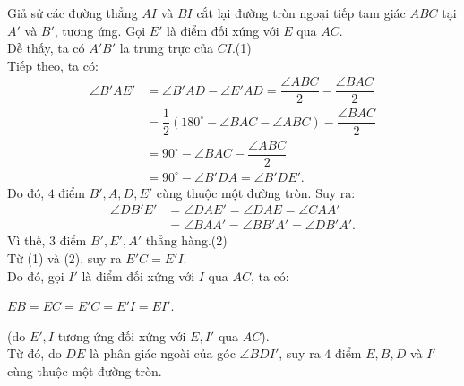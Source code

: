 \begin{bt}
{\begin{nx}
\begin{enumerate}
\begin{enumerate}
\begin{center}
					\end{center}
					Giả sử các đường thẳng $AI$ và $BI$ cắt lại đường tròn ngoại tiếp tam giác $ABC$ tại $A'$ và $B'$, tương ứng. Gọi $E'$ là điểm đối xứng với $E$ qua $AC$.\\
					Dễ thấy, ta có $A'B'$ la trung trực của $CI$.\hfill(1)\\
					Tiếp theo, ta có:
					\begin{align*}
					\angle B'AE'&=\angle B'AD-\angle E'AD=\dfrac{\angle ABC}{2}-\dfrac{\angle BAC}{2}\\&=\dfrac{1}{2}\left(180^\circ-\angle BAC-\angle ABC \right)-\dfrac{\angle BAC}{2}\\&=90^\circ-\angle BAC-\dfrac{\angle ABC}{2}\\&=90^\circ -\angle B'DA=\angle B'DE'.
					\end{align*}
					Do đó, $4$ điểm $B',A,D,E'$ cùng thuộc một đường tròn. Suy ra:\\
					\begin{align*}
					\angle DB'E'&=\angle DAE'=\angle DAE=\angle CAA'\\&=\angle BAA'=\angle BB'A'=\angle DB'A'.
					\end{align*}
					Vì thế, $3$ điểm $B',E',A'$ thẳng hàng.\hfill(2)\\
					Từ (1) và (2), suy ra $E'C=E'I$.\\
					Do đó, gọi $I'$ là điểm đối xứng với $I$ qua $AC$, ta có:\\
					\begin{center}
						$EB=EC=E'C=E'I=EI'$.
					\end{center}
					(do $E',I$ tương ứng đối xứng với $E,I'$ qua $AC$).\\
					Từ đó, do $DE$ là phân giác ngoài của góc $\angle BDI'$, suy ra $4$ điểm $E,B,D$ và $I'$ cùng thuộc một đường tròn.\\

\end{enumerate}
\end{enumerate}
\end{nx}}
\end{bt}
